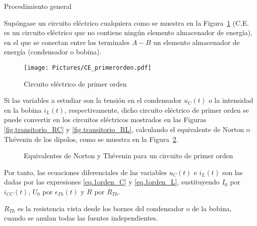 \documentclass[11pt]{book} %
\makeatletter
\numberwithin{dummy}{section}
\theoremstyle{ocrenumbox}
\theoremstyle{blacknumex}
\theoremstyle{blacknumbox}
\theoremstyle{ocrenum}
\newenvironment{remark}{\par\vspace{10pt}\small %
\begin{list}{}{
\leftmargin=35pt %
\rightmargin=25pt}\item\ignorespaces %
\makebox[-2.5pt]{\begin{tikzpicture}[overlay]
\node[draw=ocre!60,line width=1pt,circle,fill=ocre!25,font=\sffamily\bfseries,inner sep=2pt,outer sep=0pt] at (-15pt,0pt){\textcolor{ocre}{N}};\end{tikzpicture}} %
\advance\baselineskip -1pt}{\end{list}\vskip5pt} %
\renewcommand{\subsection}{\@startsection {subsection}{2}{\z@}
{-3ex \@plus -0.1ex \@minus -.4ex}
{0.5ex \@plus.2ex }
{\normalfont\sffamily\bfseries}}
\newlength\esp
\makeatother
\begin{document}

	
	
	
	
	
	
	
	
	\subsection{Procedimiento general}
	
	Supóngase un circuito eléctrico cualquiera como se muestra en la Figura~\ref{fig.CE_primerorden} (C.E. es un circuito eléctrico que no contiene ningún elemento almacenador de energía), en el que se conectan entre los terminales $A-B$ un elemento almacenador de energía (condensador o bobina). 
	\begin{figure}[htbp]
	    \centering
	    \texttt{[image: Pictures/CE\_primerorden.pdf]}
	    \caption{Circuito eléctrico de primer orden}	    \label{fig.CE_primerorden}
	\end{figure}
	
	Si las variables a estudiar son la tensión en el condensador $u_C(t)$ o la intensidad en la bobina $i_L(t)$, respectivamente, dicho circuito eléctrico de primer orden se puede convertir en los circuitos eléctricos mostrados en las Figuras \ref{fig.transitorio_RC} y \ref{fig.transitorio_RL}, calculando el equivalente de Norton o Thévenin de los dipolos, como se muestra en la Figura~\ref{fig.thevenin_1orden}. 
	\begin{figure}[htbp]
	    \centering
	    \hfil
	    \caption{Equivalentes de Norton y Thévenin para un circuito de primer orden}
	    \label{fig.thevenin_1orden}
	\end{figure}
	Por tanto, las ecuaciones diferenciales de las variables $u_C(t)$ e $i_L(t)$ son las dadas por las expresiones \eqref{eq.1orden_C} y \eqref{eq.1orden_L}, sustituyendo $I_0$ por $i_{CC}(t)$, $U_0$ por $\epsilon_{Th}(t)$ y $R$ por $R_{Th}$.
	
	\begin{remark}
	    $R_{Th}$ es la resistencia vista desde los bornes del condensador o de la bobina, cuando se anulan todas las fuentes independientes.
	\end{remark}
	
\end{document}
